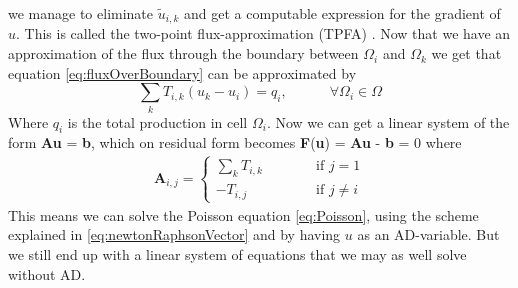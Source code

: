 we manage to eliminate $\tilde{u}_{i,k}$ and get a computable expression for the gradient of $u$. This is called the two-point flux-approximation (TPFA) \emph{\citep{lieMrstUrl}}. Now that we have an approximation of the flux through the boundary between $\Omega_i$ and $\Omega_k$ we get that equation \eqref{eq:fluxOverBoundary} can be approximated by 
\begin{equation}
    \sum_k T_{i,k}(u_k - u_i) = q_i, \hspace{3em} \forall \Omega_i \in \Omega
    \label{eq:PoissonSolvableTwoCells}
\end{equation}
Where $q_i$ is the total production in cell $\Omega_i$. Now we can get a linear system of the form \textbf{A}\textbf{u} = \textbf{b},  which on residual form becomes \textbf{F}(\textbf{u}) = \textbf{A}\textbf{u} - \textbf{b} = 0 where
\begin{align*}
    \textbf{A}_{i,j} = 
    \left\lbrace
    \begin{array}{lr}
    \sum_k T_{i,k} \hspace{3em}&\text{if } j = 1\\
    -T_{i,j} \hspace{3em}&\text{if } j \neq i
    \end{array}
    \right.
\end{align*}
This means we can solve the Poisson equation \eqref{eq:Poisson}, using the scheme explained in \eqref{eq:newtonRaphsonVector} and by having $u$ as an AD-variable. But we still end up with a linear system of equations that we may as well solve without AD. 

